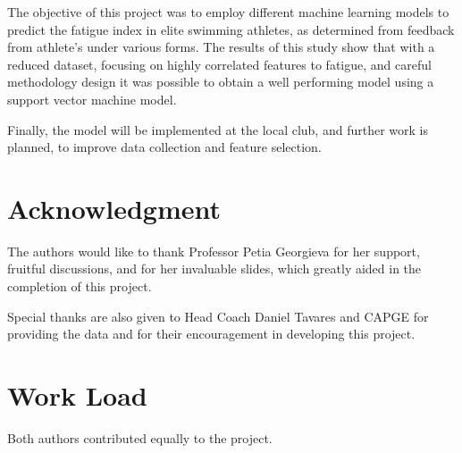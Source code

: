 \documentclass[conference]{IEEEtran}
\begin{document}
The objective of this project was to employ different machine learning models to predict the fatigue index in elite swimming athletes, as determined from feedback from athlete's under various forms. The results of this study show that with a reduced dataset, focusing on highly correlated features to fatigue, and careful methodology design it was possible to obtain a well performing model using a support vector machine model. 

Finally, the model will be implemented at the local club, and further work is planned, to improve data collection and feature selection.

\section*{Acknowledgment}

The authors would like to thank Professor Petia Georgieva for her support, fruitful discussions, and for her invaluable slides, which greatly aided in the completion of this project.

Special thanks are also given to Head Coach Daniel Tavares and CAPGE for providing the data and for their encouragement in developing this project.

\section*{Work Load}

Both authors contributed equally to the project.






\end{document}
